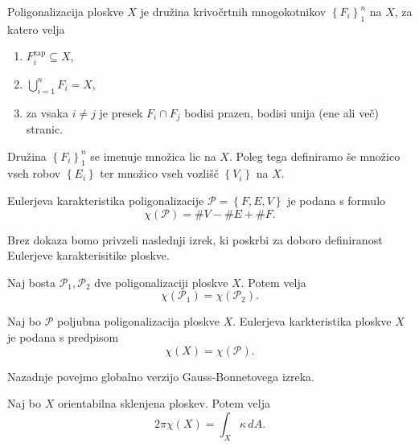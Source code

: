 \begin{definicija}
\label{def_poligonalizacija_ploskve}
Poligonalizacija ploskve $X$ je družina krivočrtnih mnogokotnikov $\left\{ F_i\right\}_1^{n}$ na $X$, za katero velja \begin{enumerate}
    \item  $F_i^{\text{zap}} \subseteq  X$,
    \item $\bigcup_{i = 1}^{n} F_i = X$,
    \item za vsaka $i \neq j$ je presek $F_i \cap  F_j$ bodisi prazen, bodisi unija (ene ali več) stranic. 
\end{enumerate}
Družina $\left\{ F_i\right\}_1^{n}$ se imenuje množica lic na $X$. Poleg tega definiramo še množico vseh robov $\left\{ E_i\right\}$ ter množico vseh vozlišč $\left\{ V_i\right\}$ na $X$.
\end{definicija}

\begin{definicija}
\label{def_Eulerjeva_karakteristika}
Eulerjeva karakteristika poligonalizacije $\mathcal{P} = \left\{ F, E, V\right\}$ je podana s formulo \begin{equation*}
\chi(\mathcal{P}) =  \#V -  \#E + \#F.
\end{equation*}  
\end{definicija}

Brez dokaza bomo privzeli naslednji izrek, ki poskrbi za doboro definiranost Eulerjeve karakterisitike ploskve.
\begin{izrek}
\label{izr_dobra_definiranost_Eulerjeve_karkteristike}
 Naj bosta $\mathcal{P}_1, \mathcal{P}_2$ dve poligonalizaciji ploskve $X$. Potem velja \begin{equation*}
 \chi(\mathcal{P}_1) = \chi(\mathcal{P}_2).
\end{equation*}  
\end{izrek}

\begin{definicija}
\label{def_Eulerjeva_karkteristika}
Naj bo $\mathcal{P}$ poljubna poligonalizacija ploskve $X$. Eulerjeva karkteristika ploskve $X$ je podana s predpisom \begin{equation*}
\chi(X) = \chi(\mathcal{P}).
\end{equation*}  
   
\end{definicija}

Nazadnje povejmo globalno verzijo Gauss-Bonnetovega izreka.

\begin{izrek}
\label{izr_globalni_GB}
Naj bo $X$ orientabilna sklenjena ploskev. Potem velja \begin{equation*}
2 \pi \chi(X) = \int_{X} \kappa \, dA.
\end{equation*}  
\end{izrek}

